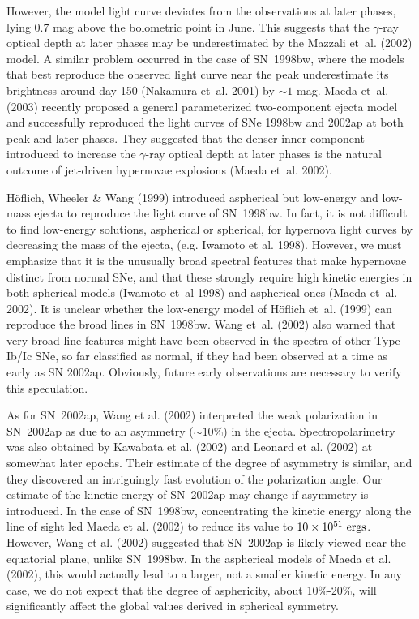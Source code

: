 \documentclass[10pt,preprint2]{aastex}
\begin{document}
However, the model light curve deviates from the observations at
later phases, lying 0.7 mag above the bolometric point in June.
This suggests that the $\gamma$-ray optical depth at later phases
may be underestimated by the Mazzali et~al. (2002) model. A similar
problem occurred in the case of SN~1998bw, where the models that best
reproduce the observed light curve near the peak underestimate its
brightness around day 150 (Nakamura et~al. 2001) by $\sim 1$ mag.
Maeda et~al. (2003) recently proposed a general parameterized two-component
ejecta model and successfully reproduced the light curves of SNe 1998bw
and 2002ap at both peak and later phases. They suggested that the denser
inner component introduced to increase the $\gamma$-ray optical depth
at later phases is the natural outcome of jet-driven hypernovae explosions
(Maeda et~al. 2002).


H\"oflich, Wheeler \& Wang (1999) introduced aspherical but
low-energy and low-mass ejecta to reproduce the light curve of
SN~1998bw. In fact, it is not difficult to find low-energy
solutions, aspherical or spherical, for hypernova light curves by
decreasing the mass of the ejecta, (e.g. Iwamoto et al. 1998).
However, we must emphasize that it is the unusually broad spectral
features that make hypernovae distinct from normal SNe, and that
these strongly require high kinetic energies in both spherical
models (Iwamoto et~al 1998) and aspherical ones (Maeda et~al.
2002). It is unclear whether the low-energy model of H\"oflich
et~al. (1999) can reproduce the broad lines in SN~1998bw. Wang
et~al. (2002) also warned that very broad line features might have
been observed in the spectra of other Type Ib/Ic SNe, so far
classified as normal, if they had been observed at a time as early
as SN 2002ap.  Obviously, future early observations are necessary
to verify this speculation.

As for SN~2002ap, Wang et al. (2002) interpreted the weak
polarization in SN~2002ap as due to an asymmetry ($\sim 10$\%) in
the ejecta. Spectropolarimetry was also obtained by Kawabata et
al. (2002) and Leonard et al. (2002) at somewhat later epochs.
Their estimate of the degree of asymmetry is similar, and they
discovered an intriguingly fast evolution of the polarization
angle. Our estimate of the kinetic energy of SN~2002ap may change
if asymmetry is introduced. In the case of SN~1998bw,
concentrating the kinetic energy along the line of sight led Maeda
et al. (2002) to reduce its value to $10\times 10^{51}~{\rm
ergs}$. However, Wang et al. (2002) suggested that SN~2002ap is
likely viewed near the equatorial plane, unlike SN~1998bw. In the
aspherical models of Maeda et al. (2002), this would actually lead
to a larger, not a smaller kinetic energy. In any case, we do not
expect that the degree of asphericity, about 10\%-20\%, will
significantly affect the global values derived in spherical
symmetry.
\end{document}
